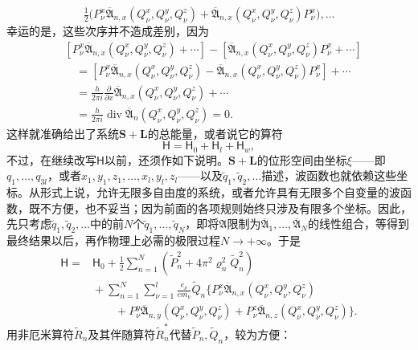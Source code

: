 \documentclass[fontsize=13pt,twoside,openany,headings=normal,parskip=false,bookmarkpackage=false,DIV=calc]{scrbook}
\begin{document}
\[
 \tfrac12\bigl(P_\nu^x\overline{\mathfrak A}_{n,x}(Q_\nu^x,Q_\nu^y,Q_\nu^z)
 +\overline{\mathfrak A}_{n,x}(Q_\nu^x,Q_\nu^y,Q_\nu^z)P_\nu^x\bigr),\ldots
\]
幸运的是，这些次序并不造成差别，因为
\begin{align*}
 &[P_\nu^x\overline{\mathfrak A}_{n,x}(Q_\nu^x,Q_\nu^y,Q_\nu^z)+\cdots]
 -[\overline{\mathfrak A}_{n,x}(Q_\nu^x,Q_\nu^y,Q_\nu^z)P_\nu^x+\cdots]\\
 &\quad=[P_\nu^x\overline{\mathfrak A}_{n,x}(Q_\nu^x,Q_\nu^y,Q_\nu^z)
 -\overline{\mathfrak A}_{n,x}(Q_\nu^x,Q_\nu^y,Q_\nu^z)P_\nu^x]+\cdots\\
 &\quad=\frac{h}{2\pi i}\frac{\partial}{\partial x}
 \overline{\mathfrak A}_{n,x}(Q_\nu^x,Q_\nu^y,Q_\nu^z)+\cdots\\
 &\quad=\frac{h}{2\pi i}\operatorname{div}\overline{\mathfrak A}_n(Q_\nu^x,Q_\nu^y,Q_\nu^z)=0.
\end{align*}\hypertarget{origpage-141}{}\label{origpage-141}这样就准确给出了系统$\boldsymbol{S}+\boldsymbol{L}$的总能量，或者说它的算符
\[
 \mathsf{H}=\mathsf{H}_0+\mathsf{H}_l+\mathsf{H}_w,
\]
不过，在继续改写$\mathsf{H}$以前，还须作如下说明。$\boldsymbol{S}+\boldsymbol{L}$的位形空间由坐标$\xi$——即$q_1,\allowbreak \ldots,\allowbreak q_{3l}$，或者$x_1,\allowbreak y_1,\allowbreak z_1,\allowbreak \ldots,\allowbreak x_l,\allowbreak y_l,\allowbreak z_l$——以及$\widetilde q_1,\allowbreak \widetilde q_2,\allowbreak \ldots$描述，波函数也就依赖这些坐标。从形式上说，允许无限多自由度的系统，或者允许具有无限多个自变量的波函数，既不方便，也不妥当；因为前面的各项规则始终只涉及有限多个坐标。因此，先只考虑$\widetilde q_1,\allowbreak \widetilde q_2,\allowbreak \ldots$中的前$N$个$\widetilde q_1,\allowbreak \ldots,\allowbreak \widetilde q_N$，即将$\mathfrak A$限制为$\overline{\mathfrak A}_1,\allowbreak \ldots,\allowbreak \overline{\mathfrak A}_N$的线性组合，等得到最终结果以后，再作物理上必需的极限过程$N\longrightarrow+\infty$。于是
\begin{align*}
 \mathsf{H}={}&\mathsf{H}_0+\tfrac12\sum_{n=1}^{N}
 (\widetilde P_n^2+4\pi^2\varrho_n^2\widetilde Q_n^2)\\
 &{}+\sum_{n=1}^{N}\sum_{\nu=1}^{l}\frac{e_\nu}{cm_\nu}\widetilde Q_n
 \bigl\{P_\nu^x\overline{\mathfrak A}_{n,x}(Q_\nu^x,Q_\nu^y,Q_\nu^z)\\
 &\qquad{}+P_\nu^y\overline{\mathfrak A}_{n,y}(Q_\nu^x,Q_\nu^y,Q_\nu^z)
 +P_\nu^z\overline{\mathfrak A}_{n,z}(Q_\nu^x,Q_\nu^y,Q_\nu^z)\bigr\}.
\end{align*}
用非厄米算符$\widetilde R_n$及其伴随算符$\widetilde R_n^*$代替$\widetilde P_n,\allowbreak \widetilde Q_n$，较为方便：
\end{document}
